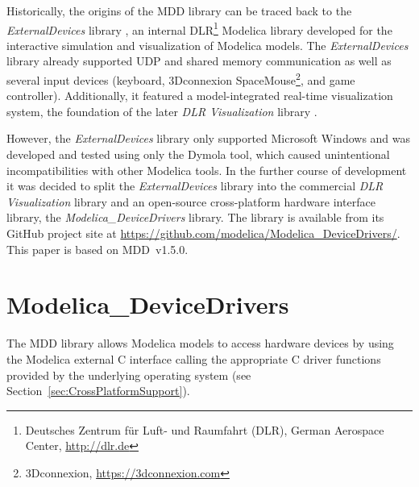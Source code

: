 \documentclass{resources/modelica}
\newcommand{\BTHI}[1]{}
\begin{document}
Historically, the origins of the MDD library can be traced back to the
\emph{ExternalDevices} library \citep{Bellmann2009}, an internal
DLR\footnote{Deutsches Zentrum für Luft- und Raumfahrt (DLR), German Aerospace
Center, \url{http://dlr.de}} Modelica library developed for the interactive
simulation and visualization of Modelica models. The \emph{ExternalDevices}
library already supported UDP and shared memory communication
as well as several input devices (keyboard, 3Dconnexion
SpaceMouse\footnote{3Dconnexion, \url{https://3dconnexion.com}}, and game
controller). Additionally, it featured a model-integrated real-time
visualization system, the foundation of the later \emph{DLR Visualization} library \citep{Hellerer2014}.

However, the \emph{ExternalDevices} library only supported
Microsoft Windows and was developed and tested using only the Dymola tool,
which caused unintentional incompatibilities with other Modelica tools.
In the further course of
development it was decided to split the \emph{ExternalDevices} library into the
commercial \emph{DLR Visualization} library and an open-source cross-platform hardware
interface library, the \emph{Modelica\_DeviceDrivers} library. The library is
available from its GitHub project site at
\url{https://github.com/modelica/Modelica_DeviceDrivers/}.
This paper is based on MDD~v1.5.0.




\section{Modelica\_DeviceDrivers}
\label{ModelicaDeviceDrivers}
\BTHI{TODO: Bernhard, Thomas, Volker}

The MDD library allows Modelica models to access hardware devices by using the Modelica external C interface calling the appropriate C driver functions provided by the underlying operating system (see
Section~\ref{sec:CrossPlatformSupport}).
\end{document}

